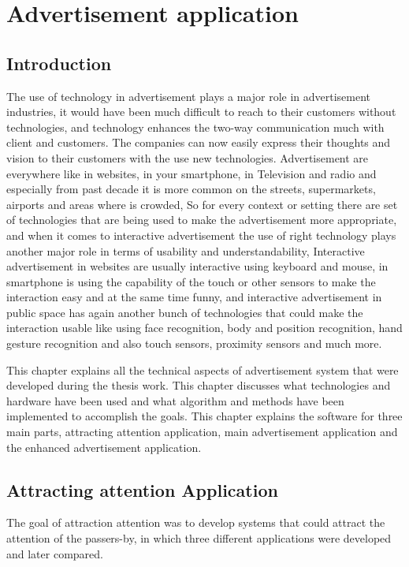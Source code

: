 \chapter{Advertisement application} %

\label{Chapter7} %

\section{Introduction}
The use of technology in advertisement plays a major role in advertisement industries, it would have been much difficult to reach to their customers without technologies, and technology enhances the two-way communication much with client and customers. The companies can now easily express their thoughts and vision to their customers with the use new technologies. Advertisement are everywhere like in websites, in your smartphone, in Television and radio and especially from past decade it is more common on the streets, supermarkets, airports and areas where is crowded, So for every context or setting there are set of technologies that are being used to make the advertisement more appropriate, and when it comes to interactive advertisement the use of right technology plays another major role in terms of usability and understandability, Interactive advertisement in websites are usually interactive using keyboard and mouse, in smartphone is using the capability of the touch or other sensors to make the interaction easy and at the same time funny, and interactive advertisement in public space has again another bunch of technologies that could make the interaction usable like using face recognition, body and position recognition, hand gesture recognition and also touch sensors, proximity sensors and much more.

This chapter explains all the technical aspects of advertisement system that were developed during the thesis work. This chapter discusses what technologies and hardware have been used and what algorithm and methods have been implemented to accomplish the goals. This chapter explains the software for three main parts, attracting attention application, main advertisement application and the enhanced advertisement application.


\section{Attracting attention Application}
The goal of attraction attention was to develop systems that could attract the attention of the passers-by, in which three different applications were developed and later compared.

